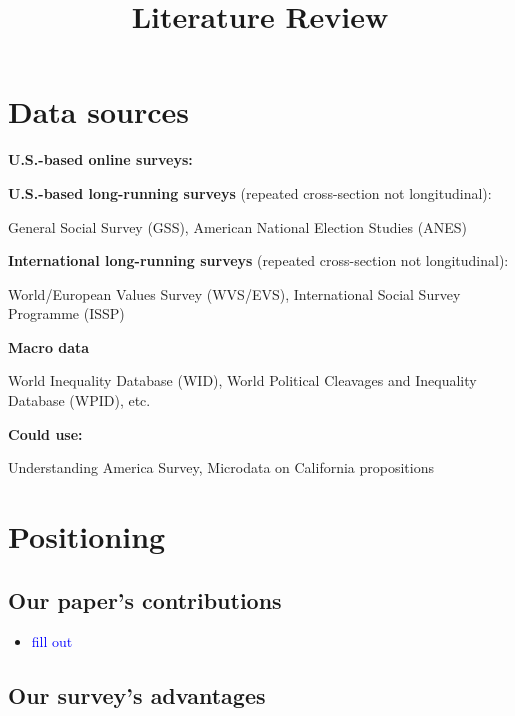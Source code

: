 \documentclass{article}
\title{Literature Review}
\author{}
\date{}
\newcommand{\blue}[1]{\textcolor{blue}{#1}}
\begin{document}
\maketitle




\section*{Data sources}

\noindent \textbf{U.S.-based online surveys:} 

\cite{chinoy2026zero, stantcheva2021understanding, alesina2018intergenerational}

\medskip\noindent\textbf{U.S.-based long-running surveys} (repeated cross-section not longitudinal): 

General Social Survey (GSS), American National Election Studies (ANES)

\medskip\noindent\textbf{International long-running surveys} (repeated cross-section not longitudinal): 

World/European Values Survey (WVS/EVS), International Social Survey Programme (ISSP)

\medskip\noindent\textbf{Macro data}

World Inequality Database (WID), World Political Cleavages and Inequality Database (WPID), etc.

\medskip\noindent\textbf{Could use:} 

Understanding America Survey, Microdata on California propositions




\section*{Positioning}

\subsection*{Our paper's contributions}

\begin{itemize}
    \item \blue{fill out}
\end{itemize}

\subsection*{Our survey's advantages}
\end{document}
